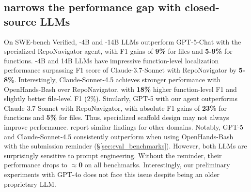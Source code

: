 \subsection{\methodname narrows the performance gap with closed-source LLMs}\label{sec:closed_source_results}
On SWE-bench Verified, \methodname-4B and \methodname-14B LLMs outperform GPT-5-Chat with the specialized RepoNavigator agent, with F1 gains of \textbf{9\%} for files and \textbf{5-9\%} for functions. \methodname-4B and 14B LLMs have impressive function-level localization performance surpassing F1 score of Claude-3.7-Sonnet with RepoNavigator by \textbf{5-8\%}. 
Interestingly, Claude-Sonnet-4.5 achieves stronger performance with OpenHands-Bash over RepoNavigator, with \textbf{18\%} higher function-level F1 and slightly better file-level F1 (2\%). Similarly, GPT-5 with our agent outperforms Claude 3.7 Sonnet with RepoNavigator, with absolute F1 gains of \textbf{23\%} for functions and \textbf{5\%} for files. Thus, specialized scaffold design may not always improve performance. \citet{soni2025codingagentsmultimodalbrowsing, mini_swe_agent_repo} report similar findings for other domains. Notably, GPT-5 and Claude-Sonnet-4.5 consistently outperform \methodname when using  OpenHands-Bash with the submission reminder (\S\ref{sec:eval_benchmarks}). However, both LLMs are surprisingly sensitive to prompt engineering. Without the reminder, their performance drops to $\approx$\textbf{0} on all benchmarks. Interestingly, our preliminary experiments with GPT-4o does not face this issue despite being an older proprietary LLM.


